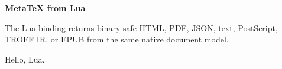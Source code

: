 \textbf{MetaTeX from Lua}\par
The Lua binding returns binary-safe HTML, PDF, JSON, text, PostScript,
TROFF IR, or EPUB from the same native document model.
\par
\def\greeting#1{Hello, #1.}
\greeting{Lua}
\bye

